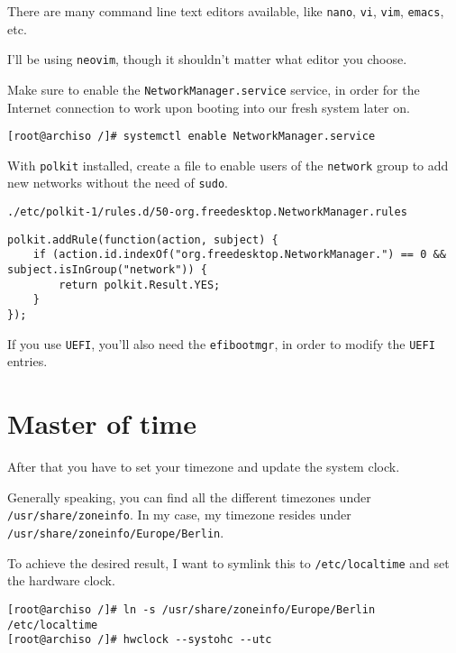 \documentclass[9pt]{report}
\newenvironment{NOTE}
{\begin{tcolorbox}[colback=admonitionBG,coltitle=draculaFG,colframe=draculaBlue,colbacktitle=draculaBlue,title=NOTE]}
{\end{tcolorbox}}
\newenvironment{mintedlisting}{\captionsetup{format=plain,width=.75\textwidth,type=listing}}{}
\begin{document}
\begin{NOTE}
    There are many command line text editors available, like \texttt{nano}, \texttt{vi}, \texttt{vim}, \texttt{emacs}, etc.


    I’ll be using \texttt{neovim}, though it shouldn’t matter what editor you choose.

\end{NOTE}
Make sure to enable the \texttt{NetworkManager.service} service, in order for the Internet connection to work upon booting into our fresh system later on.


\begin{verbatim}
[root@archiso /]# systemctl enable NetworkManager.service
\end{verbatim}

With \texttt{polkit} installed, create a file to enable users of the \texttt{network} group to add new networks without the need of \texttt{sudo}.


\begin{mintedlisting}
    \caption*{\texttt{./etc/polkit-1/rules.d/50-org.freedesktop.NetworkManager.rules}}
    \begin{verbatim}
polkit.addRule(function(action, subject) {
    if (action.id.indexOf("org.freedesktop.NetworkManager.") == 0 && subject.isInGroup("network")) {
        return polkit.Result.YES;
    }
});
    \end{verbatim}
\end{mintedlisting}

If you use \texttt{UEFI}, you’ll also need the \texttt{efibootmgr}, in order to modify the \texttt{UEFI} entries.

\newpage

\hypertarget{x-master-of-time}{\section{Master of time}}
After that you have to set your timezone and update the system clock.


Generally speaking, you can find all the different timezones under \texttt{/usr/share/zoneinfo}.
In my case, my timezone resides under \texttt{/usr/share/zoneinfo/Europe/Berlin}.


To achieve the desired result, I want to symlink this to \texttt{/etc/localtime} and set the hardware clock.


\begin{verbatim}
[root@archiso /]# ln -s /usr/share/zoneinfo/Europe/Berlin /etc/localtime
[root@archiso /]# hwclock --systohc --utc
\end{verbatim}
\end{document}
